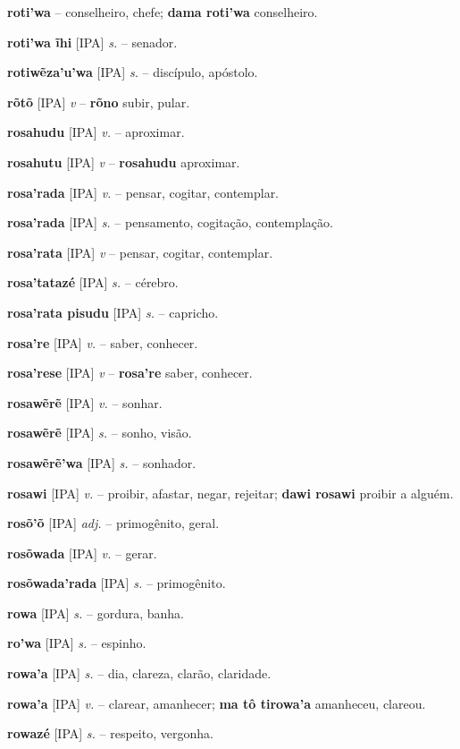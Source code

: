 \textbf{roti'wa} -- conselheiro, chefe; \textbf{dama roti'wa} conselheiro.

\textbf{roti'wa ĩhi} [IPA] \textit{s.} -- senador.

\textbf{rotiwẽza'u'wa} [IPA] \textit{s.} -- discípulo, apóstolo.

\textbf{rõtõ} [IPA] \textit{v} -- \textbf{rõno} subir, pular.

\textbf{rosahudu} [IPA] \textit{v.} -- aproximar.

\textbf{rosahutu} [IPA] \textit{v} -- \textbf{rosahudu} aproximar.

\textbf{rosa'rada} [IPA] \textit{v.} -- pensar, cogitar, contemplar.

\textbf{rosa'rada} [IPA] \textit{s.} -- pensamento, cogitação, contemplação.

\textbf{rosa'rata} [IPA] \textit{v} -- pensar, cogitar, contemplar.

\textbf{rosa'tatazé} [IPA] \textit{s.} -- cérebro.

\textbf{rosa'rata pisudu} [IPA] \textit{s.} -- capricho.

\textbf{rosa're} [IPA] \textit{v.} -- saber, conhecer.

\textbf{rosa'rese} [IPA] \textit{v} -- \textbf{rosa're} saber, conhecer.

\textbf{rosawẽrẽ} [IPA] \textit{v.} -- sonhar.

\textbf{rosawẽrẽ} [IPA] \textit{s.} -- sonho, visão.

\textbf{rosawẽrẽ'wa} [IPA] \textit{s.} -- sonhador.

\textbf{rosawi} [IPA] \textit{v.} -- proibir, afastar, negar, rejeitar; \textbf{dawi rosawi} proibir a alguém.

\textbf{rosõ'õ} [IPA] \textit{adj.} -- primogênito, geral.

\textbf{rosõwada} [IPA] \textit{v.} -- gerar.

\textbf{rosõwada'rada} [IPA] \textit{s.} -- primogênito.

\textbf{rowa} [IPA] \textit{s.} -- gordura, banha.

\textbf{ro'wa} [IPA] \textit{s.} -- espinho.

\textbf{rowa'a} [IPA] \textit{s.} -- dia, clareza, clarão, claridade.

\textbf{rowa'a} [IPA] \textit{v.} -- clarear, amanhecer; \textbf{ma tô tirowa'a} amanheceu, clareou.

\textbf{rowazé} [IPA] \textit{s.} -- respeito, vergonha.

